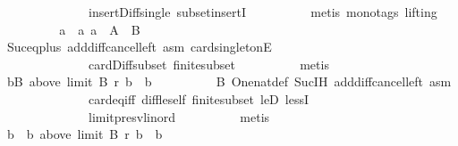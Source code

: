 \begin{isabellebody}
\ \ \ \ \ \ \ \ \ \ \ \ \ \ insert{\isacharunderscore}{\kern0pt}Diff{\isacharunderscore}{\kern0pt}single\ subset{\isacharunderscore}{\kern0pt}insertI\isanewline
\ \ \ \ \ \ \ \ \isamarkupfalse%
\ {\isacharparenleft}{\kern0pt}metis\ {\isacharparenleft}{\kern0pt}mono{\isacharunderscore}{\kern0pt}tags{\isacharcomma}{\kern0pt}\ lifting{\isacharparenright}{\kern0pt}{\isacharparenright}{\kern0pt}\isanewline
\ \ \ \ \ \ \isamarkupfalse%
\ \isamarkupfalse%
\ a\ \ a{\isacharcolon}{\kern0pt}\ {\isachardoublequoteopen}{\isacharbraceleft}{\kern0pt}a{\isacharbraceright}{\kern0pt}\ {\isacharequal}{\kern0pt}\ A\ {\isacharminus}{\kern0pt}\ B{\isachardoublequoteclose}\isanewline
\ \ \ \ \ \ \ \ \isamarkupfalse%
\ Suc{\isacharunderscore}{\kern0pt}eq{\isacharunderscore}{\kern0pt}plus{}\ add{\isacharunderscore}{\kern0pt}diff{\isacharunderscore}{\kern0pt}cancel{\isacharunderscore}{\kern0pt}left{\isacharprime}{\kern0pt}\ asm\ card{\isacharunderscore}{\kern0pt}{}{\isacharunderscore}{\kern0pt}singletonE\isanewline
\ \ \ \ \ \ \ \ \ \ \ \ \ \ card{\isacharunderscore}{\kern0pt}Diff{\isacharunderscore}{\kern0pt}subset\ finite{\isacharunderscore}{\kern0pt}subset\isanewline
\ \ \ \ \ \ \ \ \isamarkupfalse%
\ metis\isanewline
\ \ \ \ \ \ \isamarkupfalse%
\ {\isachardoublequoteopen}{\isasymexists}b{\isasymin}B{\isachardot}{\kern0pt}\ above\ {\isacharparenleft}{\kern0pt}limit\ B\ r{\isacharparenright}{\kern0pt}\ b\ {\isacharequal}{\kern0pt}\ {\isacharbraceleft}{\kern0pt}b{\isacharbraceright}{\kern0pt}{\isachardoublequoteclose}\isanewline
\ \ \ \ \ \ \ \ \isamarkupfalse%
\ B\ One{\isacharunderscore}{\kern0pt}nat{\isacharunderscore}{\kern0pt}def\ Suc{\isachardot}{\kern0pt}IH\ add{\isacharunderscore}{\kern0pt}diff{\isacharunderscore}{\kern0pt}cancel{\isacharunderscore}{\kern0pt}left{\isacharprime}{\kern0pt}\ asm\isanewline
\ \ \ \ \ \ \ \ \ \ \ \ \ \ card{\isacharunderscore}{\kern0pt}eq{\isacharunderscore}{\kern0pt}{}{\isacharunderscore}{\kern0pt}iff\ diff{\isacharunderscore}{\kern0pt}le{\isacharunderscore}{\kern0pt}self\ finite{\isacharunderscore}{\kern0pt}subset\ leD\ lessI\isanewline
\ \ \ \ \ \ \ \ \ \ \ \ \ \ limit{\isacharunderscore}{\kern0pt}presv{\isacharunderscore}{\kern0pt}lin{\isacharunderscore}{\kern0pt}ord\isanewline
\ \ \ \ \ \ \ \ \isamarkupfalse%
\ metis\isanewline
\ \ \ \ \ \ \isamarkupfalse%
\ \isamarkupfalse%
\ b\ \ b{\isacharcolon}{\kern0pt}\ {\isachardoublequoteopen}above\ {\isacharparenleft}{\kern0pt}limit\ B\ r{\isacharparenright}{\kern0pt}\ b\ {\isacharequal}{\kern0pt}\ {\isacharbraceleft}{\kern0pt}b{\isacharbraceright}{\kern0pt}{\isachardoublequoteclose}\isanewline

\end{isabellebody}

